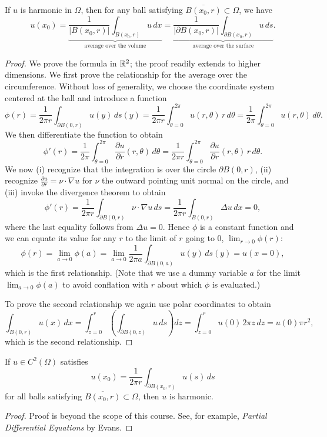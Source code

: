\begin{theorem}
    If $u$ is harmonic in $\Omega$, then for any ball satisfying $\overline{B(x_0, r)} \subset \Omega$, we have
    \[u(x_0) = \underbrace{\frac{1}{|B(x_0, r)|} \int_{B(x_0, r)} u\,dx}_{\text{average over the volume}} = \underbrace{\frac{1}{|\partial B(x_0, r)|} \int_{\partial B(x_0, r)} u\,ds}_{\text{average over the surface}}.\]
\end{theorem}
\begin{proof}
    We prove the formula in $\mathbb{R}^2$; the proof readily extends to higher dimensions. We first prove the relationship for the average over the circumference. Without loss of generality, we choose the coordinate system centered at the ball and introduce a function
    \[\phi(r) = \frac{1}{2\pi r} \int_{\partial B(0, r)} u(y)\,ds(y) = \frac{1}{2\pi r} \int_{\theta=0}^{2\pi} u(r, \theta)\,r\,d\theta = \frac{1}{2\pi} \int_{\theta=0}^{2\pi} u(r, \theta)\,d\theta.\]
    We then differentiate the function to obtain
    \[\phi'(r) = \frac{1}{2\pi} \int_{\theta=0}^{2\pi} \frac{\partial u}{\partial r}(r, \theta)\,d\theta = \frac{1}{2\pi r} \int_{\theta=0}^{2\pi} \frac{\partial u}{\partial r}(r, \theta)\,r\,d\theta.\]
    We now (i) recognize that the integration is over the circle $\partial B(0, r)$, (ii) recognize $\frac{\partial u}{\partial r} = \nu \cdot \nabla u$ for $\nu$ the outward pointing unit normal on the circle, and (iii) invoke the divergence theorem to obtain
    \[\phi'(r) = \frac{1}{2\pi r} \int_{\partial B(0, r)} \nu \cdot \nabla u\,ds = \frac{1}{2\pi r} \int_{B(0, r)} \Delta u\,dx = 0,\]
    where the last equality follows from $\Delta u = 0$. Hence $\phi$ is a constant function and we can equate its value for any $r$ to the limit of $r$ going to 0, $\lim_{r \to 0} \phi(r)$:
    \[\phi(r) = \lim_{a \to 0} \phi(a) = \lim_{a \to 0} \frac{1}{2\pi a} \int_{\partial B(0, a)} u(y)\,ds(y) = u(x = 0),\]
    which is the first relationship. (Note that we use a dummy variable $a$ for the limit $\lim_{a \to 0} \phi(a)$ to avoid conflation with $r$ about which $\phi$ is evaluated.)

    To prove the second relationship we again use polar coordinates to obtain
    \[\int_{B(0, r)} u(x)\,dx = \int_{z=0}^{r} \left(\int_{\partial B(0, z)} u\,ds\right) dz = \int_{z=0}^{r} u(0)\,2\pi z\,dz = u(0)\pi r^2,\]
    which is the second relationship.
\end{proof}

\begin{theorem}
    If $u \in C^2(\Omega)$ satisfies
    \[u(x_0) = \frac{1}{2\pi r} \int_{\partial B(x_0, r)} u(s)\,ds\]
    for all balls satisfying $\overline{B(x_0, r)} \subset \Omega$, then $u$ is harmonic.
\end{theorem}
\begin{proof}
    Proof is beyond the scope of this course. See, for example, \textit{Partial Differential Equations} by Evans.
\end{proof}

